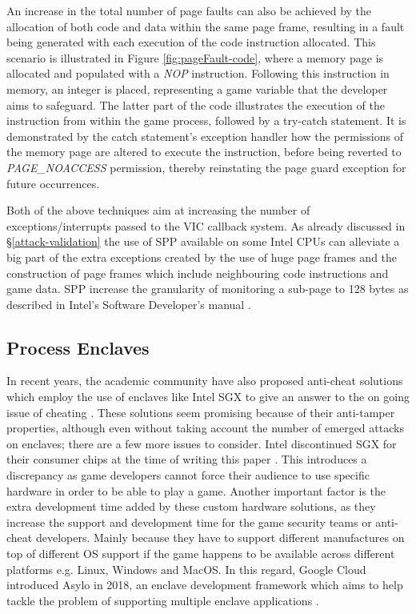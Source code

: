 An increase in the total number of page faults can also be achieved by the allocation of both code and data within the same page frame, resulting in a fault being generated with each execution of the code instruction allocated. This scenario is illustrated in Figure \ref{fig:pageFault-code}, where a memory page is allocated and populated with a \textit{NOP} instruction. Following this instruction in memory, an integer is placed, representing a game variable that the developer aims to safeguard. The latter part of the code illustrates the execution of the instruction from within the game process, followed by a try-catch statement. It is demonstrated by the catch statement's exception handler how the permissions of the memory page are altered to execute the instruction, before being reverted to \textit{PAGE\_NOACCESS} permission, thereby reinstating the page guard exception for future occurrences.


Both of the above techniques aim at increasing the number of exceptions/interrupts passed to the VIC callback system. As already discussed in \S \ref{attack-validation} the use of SPP available on some Intel CPUs can alleviate a big part of the extra exceptions created by the use of huge page frames and the construction of page frames which include neighbouring code instructions and game data. SPP increase the granularity of monitoring a sub-page to 128 bytes as described in Intel's Software Developer's manual \cite{IntelSPP}.
\subsection{Process Enclaves}
In recent years, the academic community have also proposed anti-cheat solutions which employ the use of enclaves like Intel SGX to give an answer to the on going issue of cheating  \cite{sgxCheatDetection,sgxBlackmirror}. These solutions seem promising because of their anti-tamper properties, although even without taking account the number of emerged attacks on enclaves; there are a few more issues to consider. Intel discontinued SGX for their consumer chips at the time of writing this paper \cite{intelSGXComm}. This introduces a discrepancy as game developers cannot force their audience to use specific hardware in order to be able to play a game. Another important factor is the extra development time added by these custom hardware solutions, as they increase the support and development time for the game security teams or anti-cheat developers. Mainly because they have to support different manufactures on top of different OS support if the game happens to be available across different platforms e.g. Linux, Windows and MacOS. In this regard, Google Cloud introduced Asylo in 2018, an enclave development framework which aims to help tackle the problem of supporting multiple enclave applications \cite{googleAsylo}.


